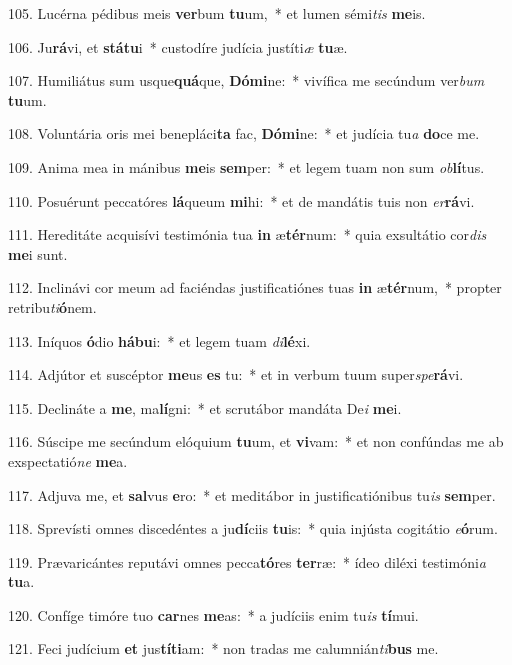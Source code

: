 105. Lucérna pédibus meis \textbf{ver}bum \textbf{tu}um,~*  et lumen sémi\textit{tis} \textbf{me}is.\

106. Ju\textbf{rá}vi, et \textbf{stá}\textbf{tu}i~*  custodíre judícia justíti\textit{æ} \textbf{tu}æ.\

107. Humiliátus sum usque\textbf{quá}que, \textbf{Dó}\textbf{mi}ne:~*  vivífica me secúndum ver\textit{bum} \textbf{tu}um.\

108. Voluntária oris mei benepláci\textbf{ta} fac, \textbf{Dó}\textbf{mi}ne:~*  et judícia tu\textit{a} \textbf{do}ce me.\

109. Anima mea in mánibus \textbf{me}is \textbf{sem}per:~*  et legem tuam non sum \textit{ob}\textbf{lí}tus.\

110. Posuérunt peccatóres \textbf{lá}queum \textbf{mi}hi:~*  et de mandátis tuis non \textit{er}\textbf{rá}vi.\

111. Hereditáte acquisívi testimónia tua \textbf{in} æ\textbf{tér}num:~*  quia exsultátio cor\textit{dis} \textbf{me}i sunt.\

112. Inclinávi cor meum ad faciéndas justificatiónes tuas \textbf{in} æ\textbf{tér}num,~*  propter retribu\textit{ti}\textbf{ó}nem.\

113. Iníquos \textbf{ó}dio \textbf{há}\textbf{bu}i:~*  et legem tuam \textit{di}\textbf{lé}xi.\

114. Adjútor et suscéptor \textbf{me}us \textbf{es} tu:~*  et in verbum tuum super\textit{spe}\textbf{rá}vi.\

115. Declináte a \textbf{me}, ma\textbf{lí}gni:~*  et scrutábor mandáta De\textit{i} \textbf{me}i.\

116. Súscipe me secúndum elóquium \textbf{tu}um, et \textbf{vi}vam:~*  et non confúndas me ab exspectatió\textit{ne} \textbf{me}a.\

117. Adjuva me, et \textbf{sal}vus \textbf{e}ro:~*  et meditábor in justificatiónibus tu\textit{is} \textbf{sem}per.\

118. Sprevísti omnes discedéntes a ju\textbf{dí}ciis \textbf{tu}is:~*  quia injústa cogitátio \textit{e}\textbf{ó}rum.\

119. Prævaricántes reputávi omnes pecca\textbf{tó}res \textbf{ter}ræ:~*  ídeo diléxi testimóni\textit{a} \textbf{tu}a.\

120. Confíge timóre tuo \textbf{car}nes \textbf{me}as:~*  a judíciis enim tu\textit{is} \textbf{tí}mui.\

121. Feci judícium \textbf{et} jus\textbf{tí}\textbf{ti}am:~*  non tradas me calumnián\textit{ti}\textbf{bus} me.\

